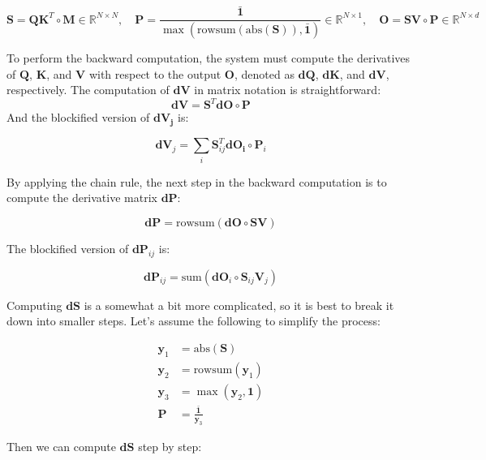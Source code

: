 $$\mathbf{S} = \mathbf{Q}\mathbf{K}^T\circ \mathbf{M} \in \mathbb{R}^{N\times N}, \quad \mathbf{P} = \frac{\mathbf{\bar{1}}}{\max(\text{rowsum}(\text{abs}(\mathbf{S})),\bar{\mathbf{1}})} \in \mathbb{R}^{N\times 1}, \quad \mathbf{O} = \mathbf{S}\mathbf{V} \circ \mathbf{P}\in \mathbb{R}^{N\times d}$$

To perform the backward computation, the system must compute the derivatives of $\mathbf{Q}$, $\mathbf{K}$,
and $\mathbf{V}$ with respect to the output $\mathbf{O}$, denoted as $\mathbf{dQ}$, $\mathbf{dK}$, and $\mathbf{dV}$, respectively.
The computation of $\mathbf{dV}$ in matrix notation is straightforward:
$$\mathbf{dV} = \mathbf{S}^T\mathbf{dO}\circ \mathbf{P}$$
And the blockified version of $\mathbf{\mathbf{dV}_j}$ is:

\begin{equation}
\mathbf{dV}_j = \sum_i \mathbf{S}_{ij}^T\mathbf{dO_i}\circ\mathbf{P}_i \label{eq:msa1}
\end{equation}

By applying the chain rule, the next step in the backward computation is to compute the derivative matrix $\mathbf{dP}$:

$$\mathbf{dP} = \text{rowsum}(\mathbf{dO} \circ \mathbf{SV})$$

The blockified version of $\mathbf{dP}_{ij}$ is:

$$\mathbf{dP}_{ij} = \text{sum}(\mathbf{dO}_i\circ\mathbf{S}_{ij}\mathbf{V}_j)$$

Computing $\mathbf{dS}$ is a somewhat a bit more complicated,
so it is best to break it down into smaller steps.
Let's assume the following to simplify the process:

\begin{align*}
\mathbf{y}_1 &= \text{abs}(\mathbf{S}) \\
\mathbf{y}_2 &= \text{rowsum}(\mathbf{y}_1) \\
\mathbf{y}_3 &= \max(\mathbf{y}_2, \mathbf{1}) \\
\mathbf{P} &= \frac{\mathbf{\bar{1}}}{\mathbf{y}_3}
\end{align*}

Then we can compute $\mathbf{dS}$ step by step:

